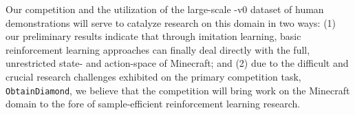 Our competition and the utilization of the large-scale \minenet-v0 dataset of human demonstrations will serve to catalyze research on this domain in two ways: (1) our preliminary results indicate that through imitation learning, basic reinforcement learning approaches can finally deal directly with the full, unrestricted state- and action-space of Minecraft;  and (2) due to the difficult and crucial research challenges exhibited on the primary competition task, \texttt{ObtainDiamond}, we believe that the competition will bring work on the Minecraft domain to the fore of sample-efficient reinforcement learning research.

